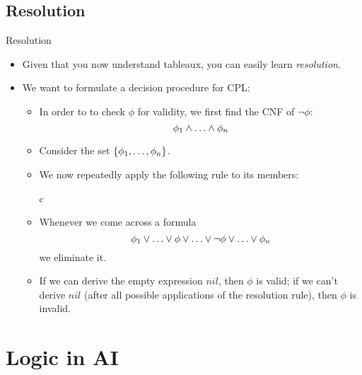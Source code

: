 \documentclass[../slides.tex]{subfiles}
\begin{document}
\subsection{Resolution}
\begin{frame}{Resolution}

  \begin{itemize}
  \item Given that you now understand tableaux, you can easily learn
    \emph{resolution}.

  \item We want to formulate a decision procedure for CPL:

    \begin{itemize}
    \item  In order to to check $\phi$ for validity, we first find the
      CNF of $\neg\phi$: \[\phi_1\land \mathellipsis\land\phi_n\]
    \item Consider the set $\{\phi_1, \mathellipsis,\phi_n\}$.
    \item We now repeatedly apply the following rule to its members:
      
      \begin{center}
        \begin{tabular}{c}
        \end{tabular}
      \end{center}
      \item Whenever we come across a formula \[\phi_1\lor
        \mathellipsis
        \lor\phi\lor\mathellipsis\lor\neg\phi\lor\mathellipsis\lor\phi_n\]
      we eliminate it.
     \item If we can derive the empty expression $nil$, then $\phi$ is
       valid; if we can't derive $nil$ (after all possible
       applications of the resolution rule), then $\phi$ is invalid.
    \end{itemize}

      
  \end{itemize}
  
\end{frame}
             

\section{Logic in AI}
\end{document}
